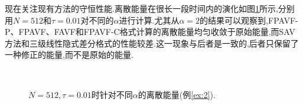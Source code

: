 现在关注现有方法的守恒性能.离散能量在很长一段时间内的演化如图\ref{fig:3}所示,分别用$N=512$和$\tau=0.01$对不同的$\alpha$进行计算.尤其从$\alpha=2$的结果可以观察到,FPAVF-P、FPAVF、FAVF和FPAVF-C格式计算的离散能量均匀收敛于原始能量,而SAV方法\cite{chengConvergenceEnergyconservingScheme2022}和三级线性隐式差分格式\cite{ranLinearlyImplicitConservative2016}的性能较差.这一现象与后者是一致的,后者只保留了一种修正的能量,而不是原始的能量.

\begin{figure}[H]
	\begin{center}
	\\
	\caption{$N = 512,\tau=0.01$时针对不同$\alpha$的离散能量(例\ref{ex:2}).} \label{fig:3}
	\end{center}
	\end{figure}


